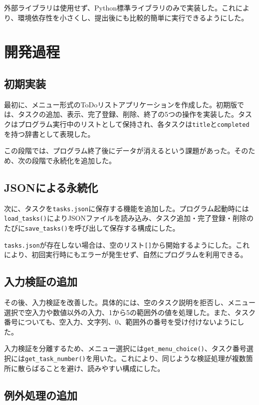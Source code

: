 \documentclass[uplatex,a4paper,11pt]{jsarticle}
\begin{document}
外部ライブラリは使用せず、Python標準ライブラリのみで実装した。これにより、環境依存性を小さくし、提出後にも比較的簡単に実行できるようにした。

\section{開発過程}

\subsection{初期実装}

最初に、メニュー形式のToDoリストアプリケーションを作成した。初期版では、タスクの追加、表示、完了登録、削除、終了の5つの操作を実装した。タスクはプログラム実行中のリストとして保持され、各タスクは\texttt{title}と\texttt{completed}を持つ辞書として表現した。

この段階では、プログラム終了後にデータが消えるという課題があった。そのため、次の段階で永続化を追加した。

\subsection{JSONによる永続化}

次に、タスクを\texttt{tasks.json}に保存する機能を追加した。プログラム起動時には\texttt{load\_tasks()}によりJSONファイルを読み込み、タスク追加・完了登録・削除のたびに\texttt{save\_tasks()}を呼び出して保存する構成にした。

\texttt{tasks.json}が存在しない場合は、空のリスト\texttt{[]}から開始するようにした。これにより、初回実行時にもエラーが発生せず、自然にプログラムを利用できる。

\subsection{入力検証の追加}

その後、入力検証を改善した。具体的には、空のタスク説明を拒否し、メニュー選択で空入力や数値以外の入力、1から5の範囲外の値を処理した。また、タスク番号についても、空入力、文字列、0、範囲外の番号を受け付けないようにした。

入力検証を分離するため、メニュー選択には\texttt{get\_menu\_choice()}、タスク番号選択には\texttt{get\_task\_number()}を用いた。これにより、同じような検証処理が複数箇所に散らばることを避け、読みやすい構成にした。

\subsection{例外処理の追加}
\end{document}
